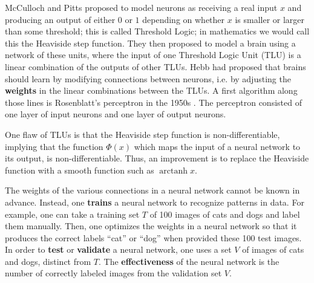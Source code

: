 \documentclass[titlepage]{article}
\theoremstyle{plain}
\theoremstyle{definition}
\begin{document}
		McCulloch and Pitts \cite{McCulloch} proposed to model neurons as receiving a real input $x$ and producing an output of either $0$ or $1$ depending on whether $x$ is smaller or larger than some threshold; this is called Threshold Logic; in mathematics we would call this the Heaviside step function. They then proposed to model a brain using a network of these units, where the input of one Threshold Logic Unit (TLU) is a linear combination of the outputs of other TLUs. Hebb\cite{Hebb} had proposed that brains should learn by modifying connections between neurons, i.e. by adjusting the {\bf weights} in the linear combinations between the TLUs. A first algorithm along those lines is Rosenblatt's perceptron in the 1950s \cite{Rosenblatt}. The perceptron consisted of one layer of input neurons and one layer of output neurons.
		
		One flaw of TLUs is that the Heaviside step function is non-differentiable, implying that the function $\Phi(x)$ which maps the input of a neural network to its output, is non-differentiable. Thus, an improvement is to replace the Heaviside function with a smooth function such as $\operatorname{arctanh} x$. 
		
		The weights of the various connections in a neural network cannot be known in advance. Instead, one {\bf trains} a neural network to recognize patterns in data. For example, one can take a training set $T$ of 100 images of cats and dogs and label them manually. Then, one optimizes the weights in a neural network so that it produces the correct labels ``cat'' or ``dog'' when provided these 100 test images. In order to {\bf test} or {\bf validate} a neural network, one uses a set $V$ of images of cats and dogs, distinct from $T$. The {\bf effectiveness} of the neural network is the number of correctly labeled images from the validation set $V$.
		
\end{document}
